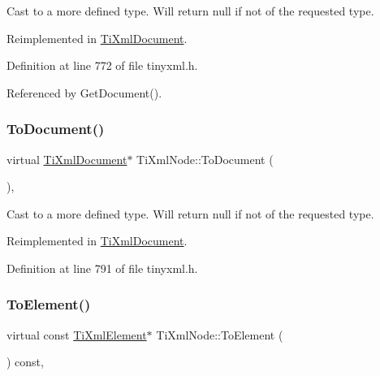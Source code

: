 Cast to a more defined type. Will return null if not of the requested type. 



Reimplemented in \hyperlink{class_ti_xml_document_a468e582640e3c4f740f7168d8b4a6e4a}{Ti\+Xml\+Document}.



Definition at line 772 of file tinyxml.\+h.



Referenced by Get\+Document().

\hypertarget{class_ti_xml_node_a6a4c8ac28ee7a745d059db6691e03bae}{}\label{class_ti_xml_node_a6a4c8ac28ee7a745d059db6691e03bae} 
\subsubsection{\texorpdfstring{To\+Document()}{ToDocument()}\hspace{0.1cm}{\footnotesize\ttfamily [2/2]}}
{\footnotesize\ttfamily virtual \hyperlink{class_ti_xml_document}{Ti\+Xml\+Document}$\ast$ Ti\+Xml\+Node\+::\+To\+Document (\begin{DoxyParamCaption}{ }\end{DoxyParamCaption})\hspace{0.3cm}{\ttfamily [inline]}, {\ttfamily [virtual]}}



Cast to a more defined type. Will return null if not of the requested type. 



Reimplemented in \hyperlink{class_ti_xml_document_a1025d942a1f328fd742d545e37efdd42}{Ti\+Xml\+Document}.



Definition at line 791 of file tinyxml.\+h.

\hypertarget{class_ti_xml_node_a4080428f2cac46e92ef4d284202fad0b}{}\label{class_ti_xml_node_a4080428f2cac46e92ef4d284202fad0b} 
\subsubsection{\texorpdfstring{To\+Element()}{ToElement()}\hspace{0.1cm}{\footnotesize\ttfamily [1/2]}}
{\footnotesize\ttfamily virtual const \hyperlink{class_ti_xml_element}{Ti\+Xml\+Element}$\ast$ Ti\+Xml\+Node\+::\+To\+Element (\begin{DoxyParamCaption}{ }\end{DoxyParamCaption}) const\hspace{0.3cm}{\ttfamily [inline]}, {\ttfamily [virtual]}}



